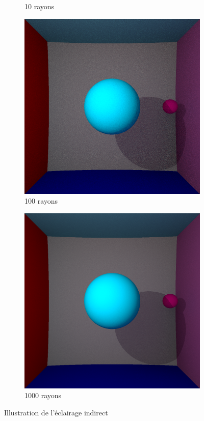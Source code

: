 \documentclass[12pt,a4paper,twoside]{report}
\begin{document}
\begin{figure}[H]
\begin{subfigure}{.45\textwidth}
		\caption{10 rayons}
		\label{fig:be3_02_10}
	\end{subfigure}
	\begin{subfigure}{.45\textwidth}
		\centering
		\includegraphics[width=1.\linewidth]{be3_02_100}
		\caption{100 rayons}
		\label{fig:be3_02_100}
	\end{subfigure}
	\begin{subfigure}{.45\textwidth}
		\centering
		\includegraphics[width=1.\linewidth]{be3_02_1000}
		\caption{1000 rayons}
		\label{fig:be3_02_1000}
	\end{subfigure}
	\caption{Illustration de l'éclairage indirect}
	\label{fig:be3_02}
\end{figure}
\end{document}
